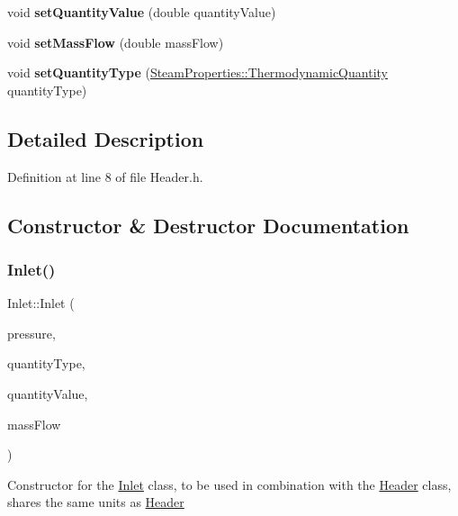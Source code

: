 \begin{DoxyCompactItemize}
\mbox{\label{class_inlet_a64a5567c35c89f82f5782bf7b83b90c3}} 
void {\bfseries set\+Quantity\+Value} (double quantity\+Value)
\item 
\mbox{\label{class_inlet_a1e427ac34eeebf46546ed53499359459}} 
void {\bfseries set\+Mass\+Flow} (double mass\+Flow)
\item 
\mbox{\label{class_inlet_a4171632101de3f4c97c93bb06c6b51e4}} 
void {\bfseries set\+Quantity\+Type} (\hyperlink{class_steam_properties_ae0294bedf7d178c2d8fb6aed0f62fbff}{Steam\+Properties\+::\+Thermodynamic\+Quantity} quantity\+Type)
\end{DoxyCompactItemize}


\subsection{Detailed Description}


Definition at line 8 of file Header.\+h.



\subsection{Constructor \& Destructor Documentation}
\mbox{\label{class_inlet_a1b0e1d27b8c7b11cfd96623b1c0b8a9e}} 
\subsubsection{\texorpdfstring{Inlet()}{Inlet()}}
{\footnotesize\ttfamily Inlet\+::\+Inlet (\begin{DoxyParamCaption}\item[{double}]{pressure,  }\item[{\hyperlink{class_steam_properties_ae0294bedf7d178c2d8fb6aed0f62fbff}{Steam\+Properties\+::\+Thermodynamic\+Quantity}}]{quantity\+Type,  }\item[{double}]{quantity\+Value,  }\item[{double}]{mass\+Flow }\end{DoxyParamCaption})}

Constructor for the \hyperlink{class_inlet}{Inlet} class, to be used in combination with the \hyperlink{class_header}{Header} class, shares the same units as \hyperlink{class_header}{Header}



